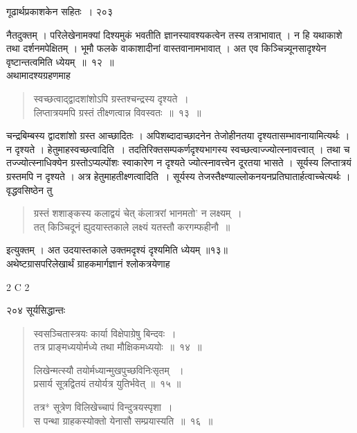 \documentclass[11pt, openany]{book}
\begin{document}
\newpage

\hspace{3.5cm} गूढार्थप्रकाशकेन सहितः~। \hfill २०३ 
\vspace{1cm}


\noindent नैतदुक्तम् । परिलेखेनामक्यां दिश्यमुकं भवतीति ज्ञानस्यावश्यकत्वेन तस्य तत्राभावात् । न हि यथाकाशे तथा दर्शनमपेक्षितम् । भूमौ फलके वाकाशादीनां वास्तवानामभावात् । अत एव किञ्चिन्न्यूनसादृश्येन वृष्टान्तत्वमिति ध्येयम्~॥~१२~॥\\
\noindent अथामादश्यग्रहणमाह\textendash


\begin{quote}
{\ssi स्वच्छत्वाद्द्वादशांशोऽपि ग्रस्तश्चन्द्रस्य दृश्यते~।\\
 लिप्तात्रयमपि ग्रस्तं तीक्ष्णत्वान्न विवस्वतः~॥~१३~॥ }
 \end{quote}


 चन्द्रबिम्बस्य द्वादशांशो ग्रस्त आच्छादितः । अपिशब्दादाच्छादनेन तेजोहीनतया दृश्यतासम्भावनायामित्यर्थः । न दृश्यते । हेतुमाह\textendash स्वच्छत्वादिति~। तदतिरिक्तसम्पकर्णदृश्यभागस्य स्वच्छत्वाज्ज्योत्स्नावत्त्वात् । तथा च तज्ज्योत्स्नाधिक्येन ग्रस्तोऽप्यल्पोंशः स्वाकारेण न दृश्यते ज्योत्स्नावत्त्वेन दूरतया भासते । सूर्यस्य लिप्तात्रयं ग्रस्तमपि न दृश्यते । अत्र हेतुमाह\textendash तीक्ष्णत्वादिति~। सूर्यस्य तेजस्तैक्ष्ण्याल्लोकनयनप्रतिघातार्हत्वाच्चेत्यर्थः । वृद्धवसिष्ठेन तु \textendash



\begin{quote}
{\qt ग्रस्तं शशाङ्कस्य कलाद्वयं चेत्  कंलात्ररां भानमतो' न लक्ष्यम्~। \\
 तत् किञ्चिदूनं ह्युदयास्तकाले  लक्ष्यं यतस्तौ करगम्फहीनौ~॥ }
 \end{quote}


इत्युक्तम् । अत उदयास्तकाले उक्तमदृश्यं दृश्यमिति ध्येयम् ॥१३॥\\
\noindent अथेष्टग्रासपरिलेखार्थं ग्राहकमार्गज्ञानं श्लोकत्रयेणाह\textendash

 {\tiny{2 C 2}}
 
 \newpage
 

\noindent २०४ \hspace{4cm} सूर्यसिद्धान्तः
\vspace{1cm}


\begin{quote}
{\ssi स्वसञ्चितास्त्रयः कार्या विक्षेपाग्रेषु बिन्दवः~।\\
 तत्र प्राङ्मध्ययोर्मध्ये तथा मौक्षिकमध्ययोः~॥~१४~॥

लिखेन्मत्स्यौ तयोर्मध्यान्मुखपुच्छविनिःसृतम् ~।\\
प्रसार्य सूत्रद्वितयं तयोर्यत्र युतिर्भवेत् ॥~१५ ॥

तत्र* सूत्रेण विलिखेच्चापं विन्दुत्रयस्पृशा~।\\
स पन्था ग्राहकस्योक्तो येनासौ सम्प्रयास्यति~॥~१६~॥ }
\end{quote}
\end{document}
